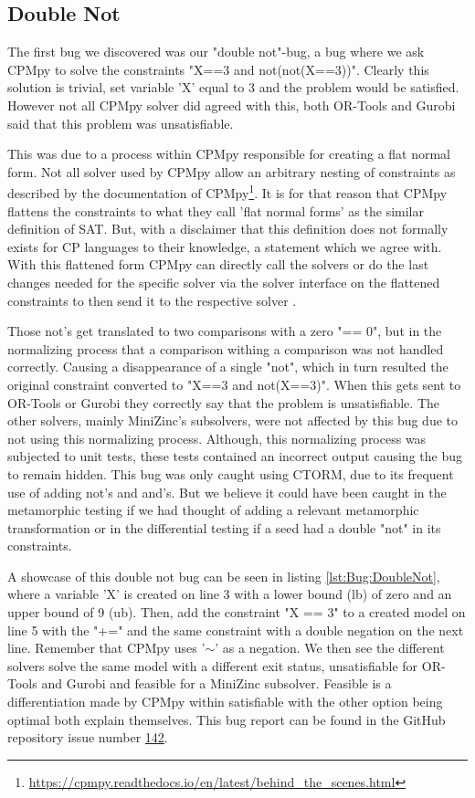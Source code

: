\subsection{Double Not}
\label{res:bug:DoubleNot}
The first bug we discovered was our "double not"-bug, a bug where we ask CPMpy to solve the constraints "X==3 and not(not(X==3))". Clearly this solution is trivial, set variable 'X' equal to 3 and the problem would be satisfied. However not all CPMpy solver did agreed with this, both OR-Tools and Gurobi said that this problem was unsatisfiable. 

This was due to a process within CPMpy responsible for creating a flat normal form. Not all solver used by CPMpy allow an arbitrary nesting of constraints as described by the documentation of CPMpy\footnote{\url{https://cpmpy.readthedocs.io/en/latest/behind_the_scenes.html}}. It is for that reason that CPMpy flattens the constraints to what they call 'flat normal forms' as the similar definition of SAT. But, with a disclaimer that this definition does not formally exists for CP languages to their knowledge, a statement which we agree with. With this flattened form CPMpy can directly call the solvers or do the last changes needed for the specific solver via the solver interface on the flattened constraints to then send it to the respective solver \cite{CPMpyGithub}. 

Those not's get translated to two comparisons with a zero "== 0", but in the normalizing process that a comparison withing a comparison was not handled correctly. Causing a disappearance of a single "not", which in turn resulted the original constraint converted to "X==3 and not(X==3)". When this gets sent to OR-Tools or Gurobi they correctly say that the problem is unsatisfiable. The other solvers, mainly MiniZinc's subsolvers, were not affected by this bug due to not using this normalizing process. Although, this normalizing process was subjected to unit tests, these tests contained an incorrect output causing the bug to remain hidden. This bug was only caught using CTORM, due to its frequent use of adding not's and and's. But we believe it could have been caught in the metamorphic testing if we had thought of adding a relevant metamorphic transformation or in the differential testing if a seed had a double "not" in its constraints. 

A showcase of this double not bug can be seen in listing \ref{lst:Bug:DoubleNot}, where a variable 'X' is created on line 3 with a lower bound (lb) of zero and an upper bound of 9 (ub). Then, add the constraint "X == 3" to a created model on line 5 with the "+=" and the same constraint with a double negation on the next line. Remember that CPMpy uses '$\sim$' as a negation. We then see the different solvers solve the same model with a different exit status, unsatisfiable for OR-Tools and Gurobi and feasible for a MiniZinc subsolver. Feasible is a differentiation made by CPMpy within satisfiable with the other option being optimal both explain themselves. This bug report can be found in the GitHub repository issue number \href{https://github.com/CPMpy/cpmpy/issues/142}{142}.


